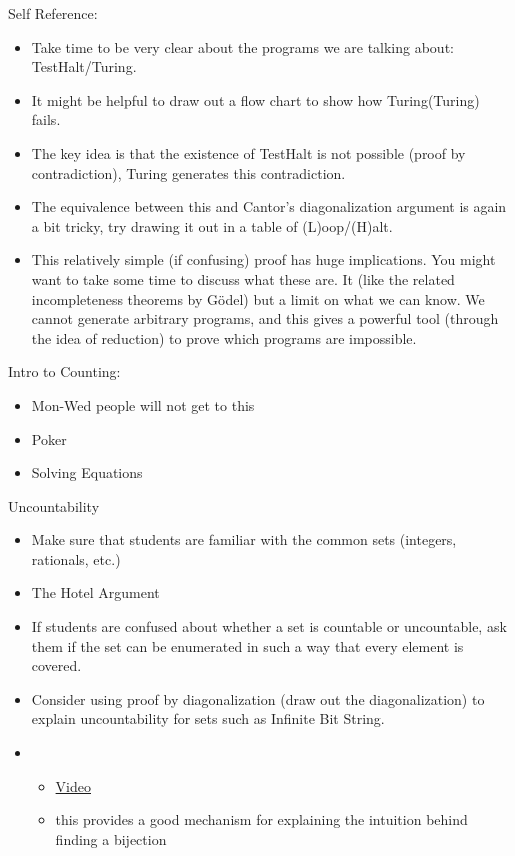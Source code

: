 \documentclass{exam}
\begin{document}
\begin{questions}
\item Self Reference: 
\begin{itemize}
  \item Take time to be very clear about the programs we are talking about: TestHalt/Turing.
  \item It might be helpful to draw out a flow chart to show how Turing(Turing) fails.
  \item The key idea is that the existence of TestHalt is not possible (proof by contradiction), Turing generates this contradiction.
  \item The equivalence between this and Cantor's diagonalization argument is again a bit tricky, try drawing it out in a table of (L)oop/(H)alt.
  \item This relatively simple (if confusing) proof has huge implications. You might want to take some time to discuss what these are. It (like the related incompleteness theorems by G\"odel) but a limit on what we can know. We cannot generate arbitrary programs, and this gives a powerful tool (through the idea of reduction) to prove which programs are impossible.
\end{itemize}
\item Intro to Counting: 
\begin{itemize}
\item Mon-Wed people will not get to this
\item Poker
\item Solving Equations
\end{itemize}
\item Uncountability
\begin{itemize}
\item Make sure that students are familiar with the common sets (integers, rationals, etc.)
\item The Hotel Argument 
\item If students are confused about whether a set is countable or uncountable, ask them if the set can be enumerated in such a way that every element is covered.
\item Consider using proof by diagonalization (draw out the diagonalization) to explain uncountability for sets such as Infinite Bit String.
\item 
\begin{itemize}
\item \href{https://www.youtube.com/watch?v=6NlwpEArfwk&list=PL-XXv-cvA_iD8wQm8U0gG_Z1uHjImKXFy&index=13}{Video}
\item this provides a good mechanism for explaining the intuition behind finding a bijection

\end{itemize}
\end{itemize}
\end{questions}
\end{document}

